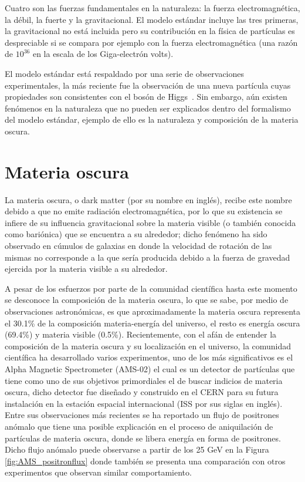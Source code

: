 Cuatro son las fuerzas fundamentales en la naturaleza: la fuerza electromagnética, la débil, la fuerte y la gravitacional. El modelo estándar incluye las tres primeras, la gravitacional no está incluida pero su contribución en la física de partículas es despreciable si se compara por ejemplo con la fuerza electromagnética (una razón de $10^{36}$ en la escala de los Giga-electrón volts). 

El modelo estándar está respaldado por una serie de observaciones experimentales, la más reciente fue la observación de una nueva partícula cuyas propiedades son consistentes con el bosón de Higgs~\cite{higgs}. Sin embargo, aún existen fenómenos en la naturaleza que no pueden ser explicados dentro del formalismo del modelo estándar, ejemplo de ello es la naturaleza y composición de la materia oscura.

\section{Materia oscura}

La materia oscura, o dark matter (por su nombre en inglés), recibe este nombre
debido a que no emite radiación electromagnética, por lo que su existencia se infiere de su influencia gravitacional sobre la materia visible (o también conocida como bariónica) que se encuentra a su alrededor; dicho fenómeno ha sido observado en cúmulos de galaxias en donde la velocidad de rotación de las mismas no corresponde a la que sería producida debido a la fuerza de gravedad ejercida por la materia visible a su alrededor.

A pesar de los esfuerzos por parte de la comunidad científica hasta este momento se desconoce la composición de la materia oscura, lo que se sabe, por medio de observaciones astronómicas, es que aproximadamente la materia oscura representa el 30.1\% de la composición materia-energía del universo, el resto es energía oscura (69.4\%) y materia visible (0.5\%). Recientemente, con el afán de entender la composición de la materia oscura y su localización en el universo, la comunidad científica ha desarrollado varios experimentos, uno de los más significativos es el Alpha Magnetic Spectrometer (AMS-02) el cual es un detector de partículas que tiene como uno de sus objetivos primordiales el de buscar indicios de materia oscura, dicho detector fue diseñado y construido en el CERN para su futura instalación en la estación espacial internacional (ISS por sus siglas en inglés). Entre sus observaciones más recientes \cite{ams:cern} se ha reportado un flujo de positrones anómalo que tiene una posible explicación en el proceso de aniquilación de partículas de materia oscura, donde se libera energía en forma de positrones. Dicho flujo anómalo puede observarse
a partir de los 25 GeV en la Figura \ref{fig:AMS_positronflux} donde también se presenta una comparación con otros experimentos que observan similar comportamiento.


